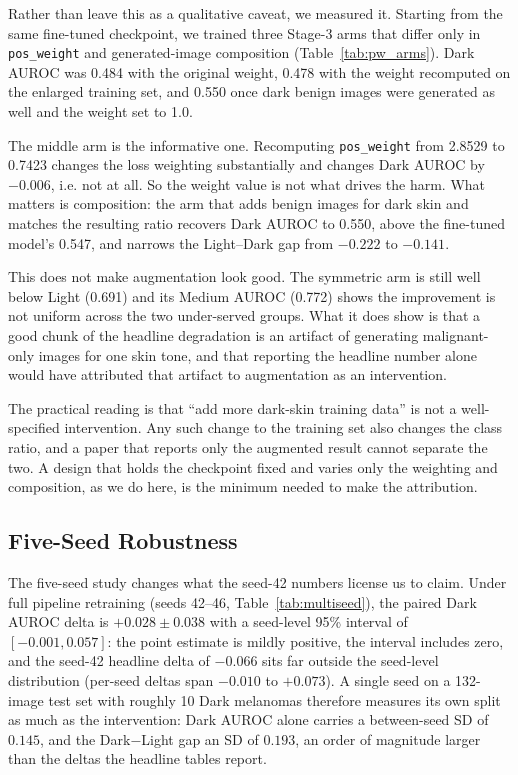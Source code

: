Rather than leave this as a qualitative caveat, we measured it. Starting from the same fine-tuned checkpoint, we trained three Stage-3 arms that differ only in \texttt{pos\_weight} and generated-image composition (Table~\ref{tab:pw_arms}). Dark AUROC was 0.484 with the original weight, 0.478 with the weight recomputed on the enlarged training set, and 0.550 once dark benign images were generated as well and the weight set to 1.0.

The middle arm is the informative one. Recomputing \texttt{pos\_weight} from 2.8529 to 0.7423 changes the loss weighting substantially and changes Dark AUROC by $-0.006$, i.e. not at all. So the weight value is not what drives the harm. What matters is composition: the arm that adds benign images for dark skin and matches the resulting ratio recovers Dark AUROC to 0.550, above the fine-tuned model's 0.547, and narrows the Light--Dark gap from $-0.222$ to $-0.141$.

This does not make augmentation look good. The symmetric arm is still well below Light (0.691) and its Medium AUROC (0.772) shows the improvement is not uniform across the two under-served groups. What it does show is that a good chunk of the headline degradation is an artifact of generating malignant-only images for one skin tone, and that reporting the headline number alone would have attributed that artifact to augmentation as an intervention.

The practical reading is that ``add more dark-skin training data'' is not a well-specified intervention. Any such change to the training set also changes the class ratio, and a paper that reports only the augmented result cannot separate the two. A design that holds the checkpoint fixed and varies only the weighting and composition, as we do here, is the minimum needed to make the attribution.

\subsection{Five-Seed Robustness}

The five-seed study changes what the seed-42 numbers license us to claim. Under full pipeline retraining (seeds 42--46, Table~\ref{tab:multiseed}), the paired Dark AUROC delta is $+0.028 \pm 0.038$ with a seed-level 95\% interval of $[-0.001, 0.057]$: the point estimate is mildly positive, the interval includes zero, and the seed-42 headline delta of $-0.066$ sits far outside the seed-level distribution (per-seed deltas span $-0.010$ to $+0.073$). A single seed on a 132-image test set with roughly 10 Dark melanomas therefore measures its own split as much as the intervention: Dark AUROC alone carries a between-seed SD of $0.145$, and the Dark$-$Light gap an SD of $0.193$, an order of magnitude larger than the deltas the headline tables report.

